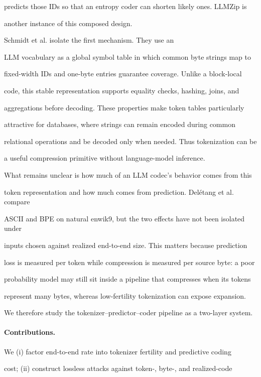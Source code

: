 \documentclass{article}
\begin{document}
predicts those IDs so that an entropy coder can shorten likely ones. LLMZip is

another instance of this composed design\~\citep{valmeekam2023llmzip}.

Schmidt et al.\~\citep{schmidt2026token} isolate the first mechanism. They use an

LLM vocabulary as a global symbol table in which common byte strings map to

fixed-width IDs and one-byte entries guarantee coverage. Unlike a block-local

code, this stable representation supports equality checks, hashing, joins, and

aggregations before decoding. These properties make token tables particularly

attractive for databases, where strings can remain encoded during common

relational operations and be decoded only when needed. Thus tokenization can be

a useful compression primitive without language-model inference.

What remains unclear is how much of an LLM codec's behavior comes from this

token representation and how much comes from prediction. Delétang et al. compare

ASCII and BPE on natural enwik9, but the two effects have not been isolated under

inputs chosen against realized end-to-end size. This matters because prediction

loss is measured per token while compression is measured per source byte: a poor

probability model may still sit inside a pipeline that compresses when its tokens

represent many bytes, whereas low-fertility tokenization can expose expansion.

We therefore study the tokenizer--predictor--coder pipeline as a two-layer system.

\paragraph{Contributions.}

We (i) factor end-to-end rate into tokenizer fertility and predictive coding

cost; (ii) construct lossless attacks against token-, byte-, and realized-code
\end{document}
